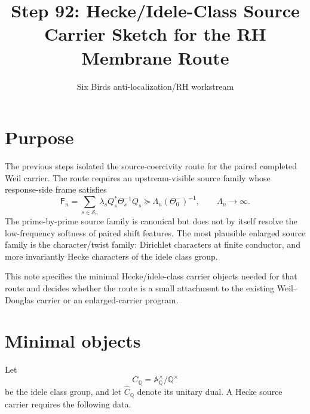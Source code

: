 \documentclass[11pt]{article}
\title{Step 92: Hecke/Idele-Class Source Carrier Sketch for the RH Membrane Route}
\author{Six Birds anti-localization/RH workstream}
\date{}
\newcommand{\F}{\mathsf F}
\begin{document}
\maketitle

\section{Purpose}
The previous steps isolated the source-coercivity route for the paired completed Weil carrier.  The route requires an upstream-visible source family whose response-side frame satisfies
\begin{equation}
  \F_n=\sum_{s\in\mathcal S_n}\lambda_s Q_s^*\Theta_s^{-1}Q_s
  \succeq \Lambda_n(\Theta_0^-)^{-1},
  \qquad \Lambda_n\to\infty .
\end{equation}
The prime-by-prime source family is canonical but does not by itself resolve the low-frequency softness of paired shift features.  The most plausible enlarged source family is the character/twist family: Dirichlet characters at finite conductor, and more invariantly Hecke characters of the idele class group.

This note specifies the minimal Hecke/idele-class carrier objects needed for that route and decides whether the route is a small attachment to the existing Weil--Douglas carrier or an enlarged-carrier program.

\section{Minimal objects}
Let
\begin{equation}
  C_{\mathbb Q}=\mathbb A_{\mathbb Q}^{\times}/\mathbb Q^{\times}
\end{equation}
be the idele class group, and let \(\widehat C_{\mathbb Q}\) denote its unitary dual.  A Hecke source carrier requires the following data.
\end{document}
